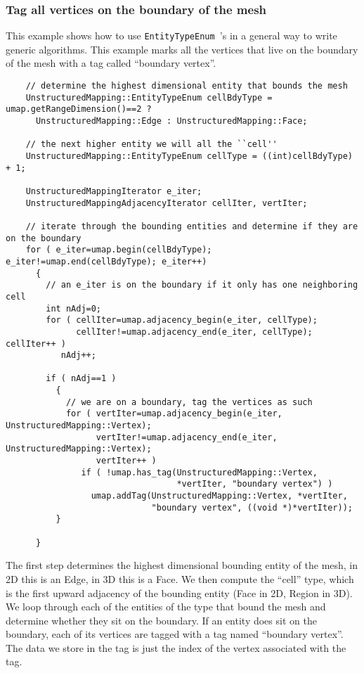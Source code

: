 \subsubsection{Tag all vertices on the boundary of the mesh}
This example shows how to use {\tt EntityTypeEnum }'s in a general way
to write generic algorithms.  This example marks all the vertices that
live on the boundary of the mesh with a tag called ``boundary vertex''.
\begin{verbatim}
    // determine the highest dimensional entity that bounds the mesh
    UnstructuredMapping::EntityTypeEnum cellBdyType = umap.getRangeDimension()==2 ? 
      UnstructuredMapping::Edge : UnstructuredMapping::Face;

    // the next higher entity we will all the ``cell''
    UnstructuredMapping::EntityTypeEnum cellType = ((int)cellBdyType) + 1;

    UnstructuredMappingIterator e_iter;
    UnstructuredMappingAdjacencyIterator cellIter, vertIter;

    // iterate through the bounding entities and determine if they are on the boundary
    for ( e_iter=umap.begin(cellBdyType); e_iter!=umap.end(cellBdyType); e_iter++)
      {
        // an e_iter is on the boundary if it only has one neighboring cell
        int nAdj=0;
        for ( cellIter=umap.adjacency_begin(e_iter, cellType); 
              cellIter!=umap.adjacency_end(e_iter, cellType); cellIter++ )
           nAdj++;
	
        if ( nAdj==1 ) 
          {
            // we are on a boundary, tag the vertices as such
            for ( vertIter=umap.adjacency_begin(e_iter, UnstructuredMapping::Vertex);
                  vertIter!=umap.adjacency_end(e_iter, UnstructuredMapping::Vertex);
                  vertIter++ )
               if ( !umap.has_tag(UnstructuredMapping::Vertex, 
                                  *vertIter, "boundary vertex") )
                 umap.addTag(UnstructuredMapping::Vertex, *vertIter, 
                             "boundary vertex", ((void *)*vertIter));
          }

      }
\end{verbatim}
The first step determines the highest dimensional bounding entity of
the mesh, in 2D this is an Edge, in 3D this is a Face.  We then
compute the ``cell'' type, which is the first upward adjacency of the
bounding entity (Face in 2D, Region in 3D).  We loop through each of
the entities of the type that bound the mesh and determine whether
they sit on the boundary.  If an entity does sit on the boundary, each
of its vertices are tagged with a tag named ``boundary vertex''.
The data we store in the tag is just the index of the vertex
associated with the tag.

